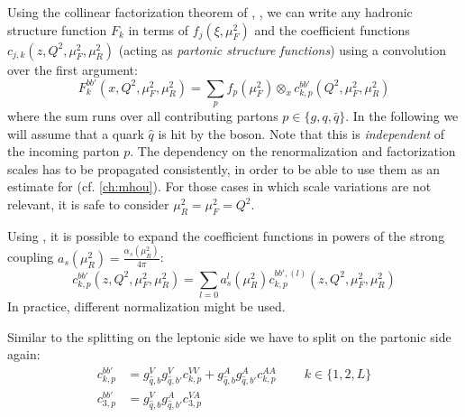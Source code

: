 
Using the collinear factorization theorem of \dis, \cite{Collins:1989gx}, we
can write any hadronic structure function $F_k$ in terms of \pdf
$f_j(\xi,\mu_F^2)$ and the coefficient functions $c_{j,k}(z,
Q^2,\mu_F^2,\mu_R^2)$ (acting as \textit{partonic structure functions}) using a
convolution over the first argument:
\begin{equation}
    F_k^{bb'}(x,Q^2,\mu_F^2,\mu_R^2) = \sum_{p} f_p(\mu_F^2) \otimes_x c_{k,p}^{bb'}(Q^2,\mu_F^2,\mu_R^2)
    \label{eq:dis/sfs-pqcd}
\end{equation}
where the sum runs over all contributing partons $p\in\{g,q,\bar q\}$. In the
following we will assume that a quark $\hat q$ is hit by the boson. Note that
this is \textit{independent} of the incoming parton $p$.
%
The dependency on the renormalization and factorization scales has to be
propagated consistently, in order to be able to use them as an estimate for
\mhou (cf. \cref{ch:mhou}).
For those cases in which scale variations are not relevant, it is safe to
consider $\mu_R^2 = \mu_F^2 = Q^2$.

Using \pqcd, it is possible to expand the coefficient functions in powers of
the strong coupling $a_s(\mu_R^2) = \frac{\alpha_s(\mu_R^2)}{4\pi}$:
\begin{equation}
    c_{k,p}^{bb'}(z, Q^2,\mu_F^2,\mu_R^2) = \sum_{l=0} a_s^l(\mu_R^2) c_{k,p}^{bb',(l)}(z, Q^2,\mu_F^2,\mu_R^2)
\end{equation}
In practice, different normalization might be used.

Similar to the splitting on the leptonic side we have to split on the partonic
side again:
\begin{align}
    c_{k,p}^{bb'} &= g_{\hat q,b}^V g_{\hat q,b'}^V c_{k,p}^{VV} + g_{\hat q,b}^A g_{\hat q,b'}^A c_{k,p}^{AA} \qquad~ k\in\{1,2,L\} \\
    c_{3,p}^{bb'} &= g_{\hat q,b}^V g_{\hat q,b'}^A c_{3,p}^{VA}
\end{align}

